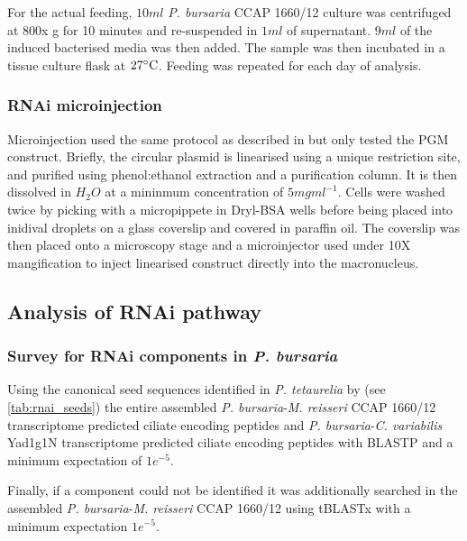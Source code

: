 For the actual feeding, \(10ml\) \textit{P. bursaria} CCAP 1660/12 culture
was centrifuged at 800x g for 10 minutes and re-suspended in \(1ml\) of supernatant.
\(9ml\) of the induced bacterised media was then added.  The sample was
then incubated in a tissue culture flask at \(27\celsius\).
Feeding was repeated for each day of analysis. 

\subsubsection{RNAi microinjection}

Microinjection used the same protocol as described in \citep{Beisson2010b} 
but only tested the PGM construct.
Briefly, the circular plasmid is linearised using a unique restriction site,
and purified using phenol:ethanol extraction and a purification column.
It is then dissolved in \(H_{2}O\) at a mininmum concentration of 
\(5mg ml^{-1}\).
Cells were washed twice by picking with a micropippete in Dryl-BSA wells before
being placed into inidival droplets on a glass coverslip and covered in paraffin oil.
The coverslip was then placed onto a microscopy stage and a microinjector 
used under 10X mangification to inject linearised construct directly into the
macronucleus.

\subsection{Analysis of RNAi pathway}

\subsubsection{Survey for RNAi components in \textit{P. bursaria}}

Using the canonical seed sequences identified in \textit{P. tetaurelia}
by \citep{Marker2014} (see \cref{tab:rnai_seeds}) the entire assembled 
\textit{P. bursaria}-\textit{M. reisseri} CCAP 1660/12 transcriptome predicted
ciliate encoding peptides and
\textit{P. bursaria}-\textit{C. variabilis} Yad1g1N transcriptome predicted 
ciliate encoding peptides with BLASTP and a minimum expectation
of \(1e^{-5}\).

Finally, if a component could not be identified it was additionally
searched in the assembled \textit{P. bursaria}-\textit{M. reisseri} CCAP 1660/12
using tBLASTx with a minimum expectation \(1e^{-5}\).

